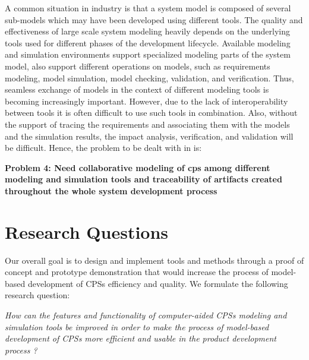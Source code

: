 A common situation in industry is that a system model is composed of several sub-models which may have been developed using different tools. The quality and effectiveness of large scale system modeling heavily depends on the underlying tools used for different phases of the development lifecycle. Available modeling and simulation environments support specialized modeling parts of the system model, also support different operations on models, such as requirements modeling, model simulation, model checking, validation, and verification. Thus, seamless exchange of models in the context of different modeling tools is becoming increasingly important. However, due to the lack of interoperability between tools it is often difficult to use such tools in combination. Also, without the support of tracing the requirements and associating them with the models and the simulation results, the impact analysis, verification, and validation will be difficult. Hence, the problem to be dealt with in is:

\begin{description}

\item \textbf{Problem 4: Need collaborative modeling of \acrshort{cps} among different modeling and simulation tools and traceability of artifacts created throughout the whole system development process}

\end{description}


\section{Research Questions}
\label{sec:Research Questions}

Our overall goal is to design and implement tools and methods through a proof of concept and prototype demonstration that would increase the process of model-based development of CPSs efficiency and quality. We formulate the following research question:

\textit{How can the features and functionality of computer-aided CPSs modeling and simulation tools be improved in order to make the process of model-based development of CPSs more efficient and usable in the product development process ? } 

